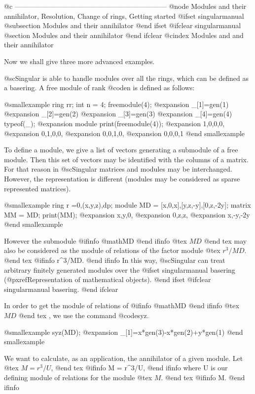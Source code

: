 @c ------------------------------------------------------------------
@node Modules and their annihilator, Resolution, Change of rings, Getting started
@ifset singularmanual
@subsection Modules and their annihilator
@end ifset
@ifclear singularmanual
@section Modules and their annihilator
@end ifclear
@cindex Modules and and their annihilator

Now we shall give three more advanced examples.

@sc{Singular} is able to handle modules over all the rings,
which can be defined as a basering. A free module of rank @code{n}
is defined as follows:

@smallexample
ring rr;
int n = 4;
freemodule(4);
@expansion{} _[1]=gen(1)
@expansion{} _[2]=gen(2)
@expansion{} _[3]=gen(3)
@expansion{} _[4]=gen(4)
typeof(_);
@expansion{} module
print(freemodule(4));
@expansion{} 1,0,0,0,
@expansion{} 0,1,0,0,
@expansion{} 0,0,1,0,
@expansion{} 0,0,0,1
@end smallexample

To define a module, we give a list of vectors generating a submodule of
a free module. Then this set of vectors may be identified with the
columns of a matrix.  For that reason in @sc{Singular} matrices and
modules may be interchanged. However, the representation is different
(modules may be considered as sparse represented matrices).

@smallexample
ring r =0,(x,y,z),dp;
module MD = [x,0,x],[y,z,-y],[0,z,-2y];
matrix MM = MD;
print(MM);
@expansion{} x,y,0,
@expansion{} 0,z,z,
@expansion{} x,-y,-2y
@end smallexample

However the submodule 
@ifinfo
@math{MD}
@end ifinfo
@tex
$MD$
@end tex
 may also be considered as the module
of relations of the factor module
@tex
$r^3/MD$.
@end tex
@ifinfo
r^3/MD.
@end ifinfo
In this way, @sc{Singular} can treat arbitrary finitely generated modules
over the
@ifset singularmanual
basering (@pxref{Representation of mathematical objects}).
@end ifset
@ifclear singularmanual
basering.
@end ifclear

In order to get the module of relations of 
@ifinfo
@math{MD}
@end ifinfo
@tex
$MD$
@end tex
,
we use the command @code{syz}.

@smallexample
syz(MD);
@expansion{} _[1]=x*gen(3)-x*gen(2)+y*gen(1)
@end smallexample

We want to calculate, as an application, the annihilator of a given module.
Let
@tex
$M = r^3/U$,
@end tex
@ifinfo
M = r^3/U,
@end ifinfo
where U is our defining module of relations for the module
@tex
$M$.
@end tex
@ifinfo
M.
@end ifinfo

